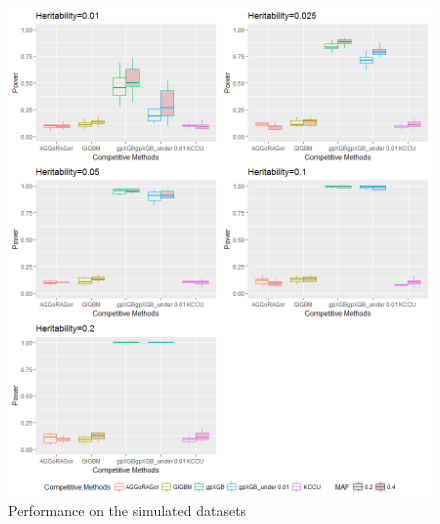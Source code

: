 \documentclass[11pt]{article}
\theoremstyle{plain}
\theoremstyle{definition}
\theoremstyle{remark}
\begin{document}
\begin{figure}[H]
    \begin{center}
       \includegraphics[scale=0.6]{Rplot02.png}
    \end{center}
\caption{\label{det}Performance on the simulated datasets}
\end{figure}
\end{document}
